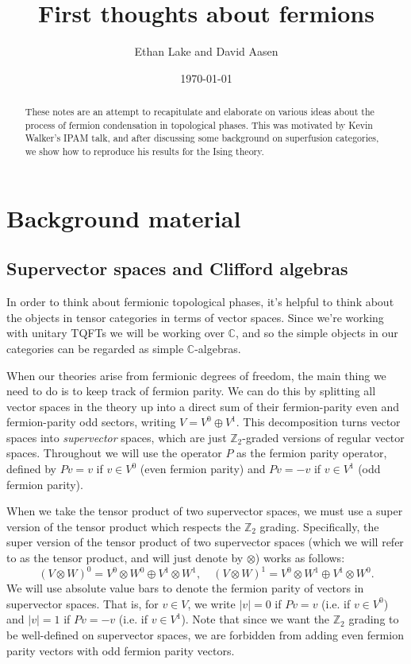 \documentclass[12pt,a4paper]{article}
\newcommand{\tp}{\otimes}
\newcommand{\cc}{\mathbb{C}}
\newcommand{\zt}{\mathbb{Z}_2}
\newcommand\be            {\begin{equation}}
\newcommand\ee            {\end{equation}}
\begin{document}
\title{First thoughts about fermions}
\author{Ethan Lake and David Aasen}

\date{\today}

\maketitle


\begin{abstract}
These notes are an attempt to recapitulate and elaborate on various ideas about the process of fermion condensation in topological phases. This was motivated by Kevin Walker's IPAM talk, and after discussing some background on superfusion categories, we show how to reproduce his results for the Ising theory.
\end{abstract}


\section{Background material} 

\subsection{Supervector spaces and Clifford algebras}
 
In order to think about fermionic topological phases, it's helpful to think about the objects in tensor 
categories in terms of vector spaces. Since we're working with unitary TQFTs we will be working over $\cc$, and so the simple objects in our categories can be regarded as simple $\cc$-algebras. 

When our theories arise from fermionic degrees of freedom, the main thing we need to do is to keep track of fermion parity. We can do this by splitting all vector spaces in the theory up into a direct sum of their fermion-parity even and fermion-parity odd sectors, writing $V = V^0 \oplus V^1$. This decomposition turns vector spaces into {\it supervector} spaces, which are just $\zt$-graded versions of regular vector spaces. Throughout we will use the operator $P$ as the fermion parity operator, defined by $Pv = v$ if $v\in V^0$ (even fermion parity) and $Pv = -v $ if $v\in V^1$ (odd fermion parity). 

When we take the tensor product of two supervector spaces, we must use a super version of the tensor product which respects the $\zt$ grading. Specifically, the super version of the tensor product of two supervector spaces (which we will refer to as the tensor product, and will just denote by $\tp$) works as follows:
\be (V\tp W)^0 = V^0 \tp W^0 \oplus V^1 \tp W^1,\quad (V\tp W)^1 = V^0 \tp W^1 \oplus V^1 \tp W^0.\ee
We will use absolute value bars to denote the fermion parity of vectors in supervector spaces. That is, for $v\in V$, we write $|v| = 0$ if $Pv = v$ (i.e. if $v\in V^0$) and $|v| = 1$ if $Pv = -v$ (i.e. if $v\in V^1$). Note that since we want the $\zt$ grading to be well-defined on supervector spaces, we are forbidden from adding even fermion parity vectors with odd fermion parity vectors. 
\end{document}
